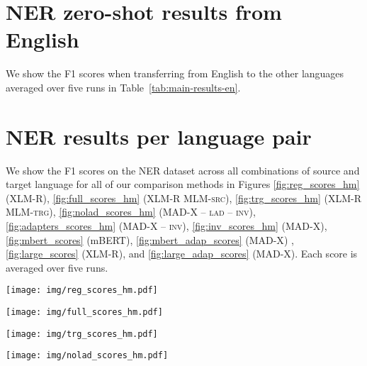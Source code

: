 \documentclass[11pt,a4paper]{article}
\newcommand{\model}[1]{\textsc{MAD-X}}
\newcommand{\xlmr}[1]{\textsc{XLM-R}}
\newcommand{\mlmsrc}[1]{\textsc{XLM-R MLM-src}}
\newcommand{\mlmtrg}[1]{\textsc{XLM-R MLM-trg}}
\begin{document}
\section{NER zero-shot results from English}
\label{s:ner-zs-en}

We show the F1 scores when transferring from English to the other languages averaged over five runs in Table~\ref{tab:main-results-en}.

\section{NER results per language pair}
\label{s:ner-all-pairs}

We show the F1 scores on the NER dataset across all combinations of source and target language for all of our comparison methods in Figures \ref{fig:reg_scores_hm} (\xlmr{}), \ref{fig:full_scores_hm} (\mlmsrc{}), \ref{fig:trg_scores_hm} (\mlmtrg{}), \ref{fig:nolad_scores_hm} (\model{} -- \textsc{lad} -- \textsc{inv}), \ref{fig:adapters_scores_hm} (\model{} -- \textsc{inv}), \ref{fig:inv_scores_hm} (\model{}), \ref{fig:mbert_scores} (mBERT), \ref{fig:mbert_adap_scores} (\model{}) , \ref{fig:large_scores} (\xlmr{}), and  \ref{fig:large_adap_scores} (\model{}). Each score is averaged over five runs. 

 \begin{figure*} \centering
\texttt{[image: img/reg\_scores\_hm.pdf]}
\caption{Mean F1 scores of XLM-R in the standard setting (\xlmr{}) for cross-lingual transfer on NER.}
\label{fig:reg_scores_hm}
\end{figure*}

 \begin{figure*} \centering
\texttt{[image: img/full\_scores\_hm.pdf]}
\caption{Mean F1 scores of XLM-R with MLM fine-tuning on source language data (\mlmsrc{}) for cross-lingual transfer on NER.}
\label{fig:full_scores_hm}
\end{figure*}


 \begin{figure*} \centering
\texttt{[image: img/trg\_scores\_hm.pdf]}
\caption{Mean F1 scores of XLM-R with MLM fine-tuning on target language data (\mlmtrg{}) for cross-lingual transfer on NER.}
\label{fig:trg_scores_hm}
\end{figure*}

 \begin{figure*} \centering
\texttt{[image: img/nolad\_scores\_hm.pdf]}
\caption{Mean F1 scores of our framework without language adapters and invertible adapters (\model{} -- \textsc{lad} -- \textsc{inv}) for cross-lingual transfer on NER.}
\label{fig:nolad_scores_hm}
\end{figure*}
\end{document}
